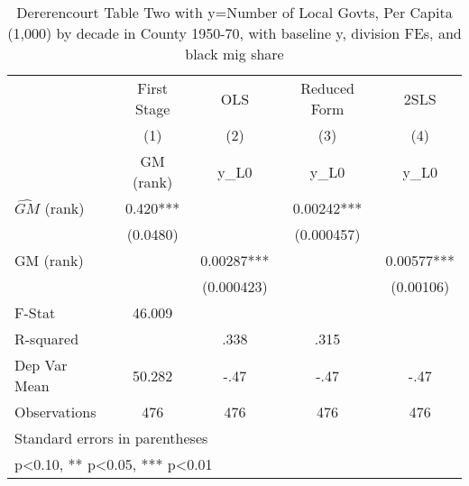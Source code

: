 \begin{table}[htbp]\centering
\def\sym#1{\ifmmode^{#1}\else\(^{#1}\)\fi}
\caption{Dererencourt Table Two with y=Number of Local Govts, Per Capita (1,000) by decade in County 1950-70, with baseline y, division FEs, and black mig share}
\begin{tabular}{l*{4}{c}}
\toprule
                    & First Stage   &         OLS   &Reduced Form   &        2SLS   \\
                    &\multicolumn{1}{c}{(1)}&\multicolumn{1}{c}{(2)}&\multicolumn{1}{c}{(3)}&\multicolumn{1}{c}{(4)}\\
                    &\multicolumn{1}{c}{GM  (rank)}&\multicolumn{1}{c}{y\_L0}&\multicolumn{1}{c}{y\_L0}&\multicolumn{1}{c}{y\_L0}\\
\midrule
$\hat{GM}$ (rank)   &       0.420***&               &     0.00242***&               \\
                    &    (0.0480)   &               &  (0.000457)   &               \\
\addlinespace
GM  (rank)          &               &     0.00287***&               &     0.00577***\\
                    &               &  (0.000423)   &               &   (0.00106)   \\
\midrule
F-Stat              &      46.009   &               &               &               \\
R-squared           &               &        .338   &        .315   &               \\
Dep Var Mean        &      50.282   &        -.47   &        -.47   &        -.47   \\
Observations        &         476   &         476   &         476   &         476   \\
\bottomrule
\multicolumn{5}{l}{\footnotesize Standard errors in parentheses}\\
\multicolumn{5}{l}{\footnotesize * p<0.10, ** p<0.05, *** p<0.01}\\
\end{tabular}
\end{table}
